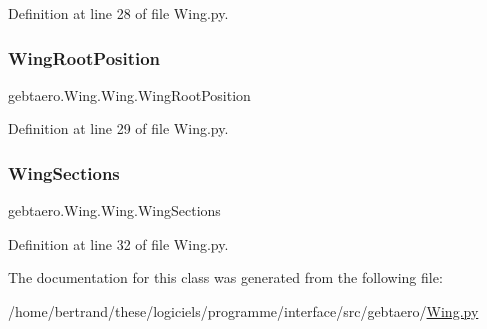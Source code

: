 Definition at line 28 of file Wing.\+py.

\mbox{\label{classgebtaero_1_1_wing_1_1_wing_aa0957399544603f1df3cdb3b02eeda4a}} 
\subsubsection{\texorpdfstring{Wing\+Root\+Position}{WingRootPosition}}
{\footnotesize\ttfamily gebtaero.\+Wing.\+Wing.\+Wing\+Root\+Position}



Definition at line 29 of file Wing.\+py.

\mbox{\label{classgebtaero_1_1_wing_1_1_wing_a87db863f3c208b18c8e7594d75598a1d}} 
\subsubsection{\texorpdfstring{Wing\+Sections}{WingSections}}
{\footnotesize\ttfamily gebtaero.\+Wing.\+Wing.\+Wing\+Sections}



Definition at line 32 of file Wing.\+py.



The documentation for this class was generated from the following file\+:\begin{DoxyCompactItemize}
\item 
/home/bertrand/these/logiciels/programme/interface/src/gebtaero/\hyperlink{_wing_8py}{Wing.\+py}\end{DoxyCompactItemize}
